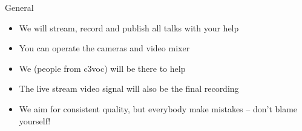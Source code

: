 
\begin{frame}{General}
	\begin{itemize}
		\item We will stream, record and publish all talks with your help
		\item You can operate the cameras and video mixer
		\item We (people from c3voc) will be there to help
		\item The live stream video signal will also be the final recording
		\item We aim for consistent quality, but everybody make mistakes -- don't blame yourself!
	\end{itemize}
\end{frame}
